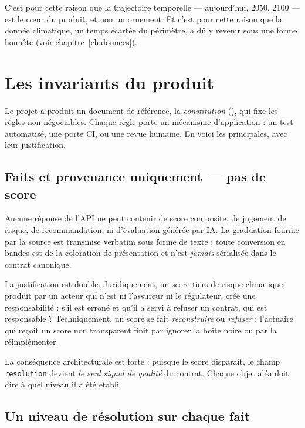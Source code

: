 C'est pour cette raison que la trajectoire temporelle — aujourd'hui, 2050,
2100 — est le cœur du produit, et non un ornement. Et c'est pour cette raison
que la donnée climatique, un temps écartée du périmètre, a dû y revenir sous
une forme honnête (voir chapitre~\ref{ch:donnees}).

\section{Les invariants du produit}

Le projet a produit un document de référence, la \emph{constitution}
(), qui fixe les règles non négociables. Chaque règle
porte un mécanisme d'application : un test automatisé, une porte CI, ou une
revue humaine. En voici les principales, avec leur justification.

\subsection{Faits et provenance uniquement — pas de score}

\begin{invariant}
Aucune réponse de l'API ne peut contenir de score composite, de jugement de
risque, de recommandation, ni d'évaluation générée par IA. La graduation
fournie par la source est transmise verbatim sous forme de texte ; toute
conversion en bandes est de la coloration de présentation et n'est
\emph{jamais} sérialisée dans le contrat canonique.
\end{invariant}

La justification est double. Juridiquement, un score tiers de risque
climatique, produit par un acteur qui n'est ni l'assureur ni le régulateur,
crée une responsabilité : s'il est erroné et qu'il a servi à refuser un
contrat, qui est responsable ? Techniquement, un score se fait
\emph{reconstruire} ou \emph{refuser} : l'actuaire qui reçoit un score
non transparent finit par ignorer la boîte noire ou par la réimplémenter.

La conséquence architecturale est forte : puisque le score disparaît, le champ
\texttt{resolution} devient \emph{le seul signal de qualité} du contrat. Chaque
objet aléa doit dire à quel niveau il a été établi.

\subsection{Un niveau de résolution sur chaque fait}

